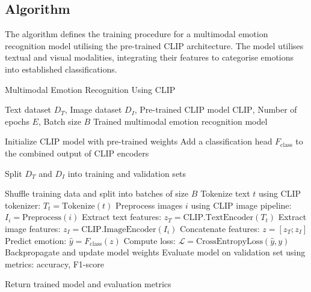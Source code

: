 \documentclass{article}
\theoremstyle{plain}
\theoremstyle{definition}
\theoremstyle{remark}
\begin{document}
\subsection{Algorithm}
The algorithm defines the training procedure for a multimodal emotion recognition model utilising the pre-trained CLIP architecture. The model utilises textual and visual modalities, integrating their features to categorise emotions into established classifications.

\begin{algorithm}
\caption{Multimodal Emotion Recognition Using CLIP}
\label{alg:multimodal_emotion_recognition}
\begin{algorithmic}[1]
\REQUIRE Text dataset $D_T$, Image dataset $D_I$, Pre-trained CLIP model $\text{CLIP}$, Number of epochs $E$, Batch size $B$
\ENSURE Trained multimodal emotion recognition model

\STATE Initialize CLIP model with pre-trained weights
\STATE Add a classification head $F_{\text{class}}$ to the combined output of CLIP encoders

\STATE Split $D_T$ and $D_I$ into training and validation sets

    \STATE Shuffle training data and split into batches of size $B$
        \STATE Tokenize text $t$ using CLIP tokenizer: $T_t = \text{Tokenize}(t)$
        \STATE Preprocess images $i$ using CLIP image pipeline: $I_i = \text{Preprocess}(i)$
        \STATE Extract text features: $z_T = \text{CLIP.TextEncoder}(T_t)$
        \STATE Extract image features: $z_I = \text{CLIP.ImageEncoder}(I_i)$
        \STATE Concatenate features: $z = [z_T; z_I]$
        \STATE Predict emotion: $\hat{y} = F_{\text{class}}(z)$
        \STATE Compute loss: $\mathcal{L} = \text{CrossEntropyLoss}(\hat{y}, y)$
        \STATE Backpropagate and update model weights
    \ENDFOR
    \STATE Evaluate model on validation set using metrics: accuracy, F1-score
\ENDFOR

\STATE Return trained model and evaluation metrics
\end{algorithmic}
\end{algorithm}
\end{document}
